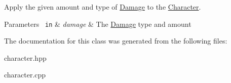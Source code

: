 Apply the given amount and type of \mbox{\hyperlink{struct_damage}{Damage}} to the \mbox{\hyperlink{class_character}{Character}}. 


\begin{DoxyParams}[1]{Parameters}
\mbox{\texttt{ in}}  & {\em damage} & The \mbox{\hyperlink{struct_damage}{Damage}} type and amount \\
\hline
\end{DoxyParams}


The documentation for this class was generated from the following files\+:\begin{DoxyCompactItemize}
\item 
character.\+hpp\item 
character.\+cpp\end{DoxyCompactItemize}
